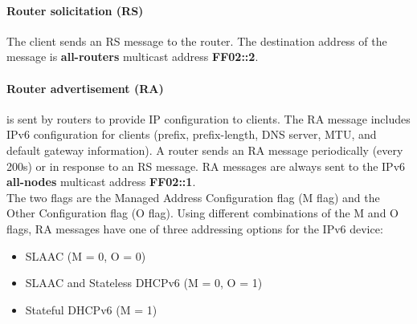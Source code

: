 \paragraph{Router solicitation (RS)} The client sends an RS message to the router. The destination address of the message is \textbf{all-routers} multicast address \textbf{FF02::2}.

\paragraph{Router advertisement (RA)} is sent by routers to provide IP configuration to clients. The RA message includes IPv6 configuration for clients (prefix, prefix-length, DNS server, MTU, and default gateway information). A router sends an RA message periodically (every 200s) or in response to an RS message. RA messages are always sent to the IPv6 \textbf{all-nodes} multicast address \textbf{FF02::1}.\\

The two flags are the Managed Address Configuration flag (M flag) and the Other Configuration flag (O flag). Using different combinations of the M and O flags, RA messages have one of three addressing options for the IPv6 device:

\begin{itemize}
\item SLAAC (M = 0, O = 0)
\item SLAAC and Stateless DHCPv6 (M = 0, O = 1)
\item Stateful DHCPv6 (M = 1)
\end{itemize}



